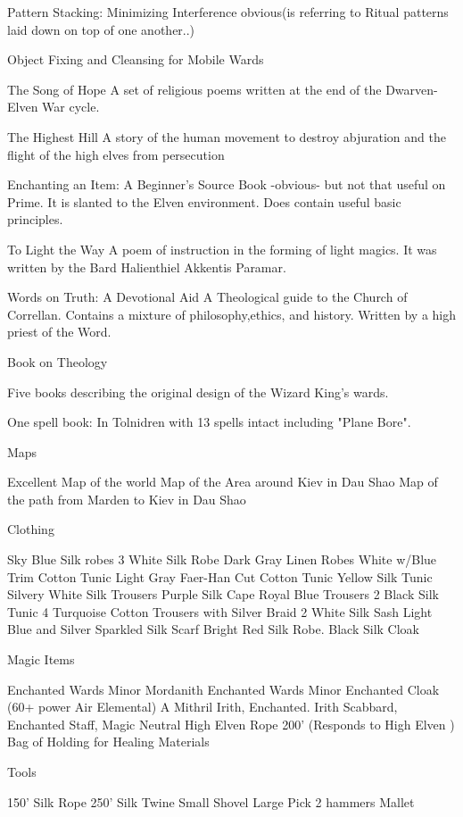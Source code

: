 Pattern Stacking: Minimizing Interference
obvious(is referring to Ritual patterns laid down on top of one
another..)

Object Fixing and Cleansing for Mobile Wards

The Song of Hope
A set of religious poems written at the end
of the Dwarven-Elven War cycle.

The Highest Hill
A story of the human movement to destroy abjuration
and the flight of the high elves from persecution

Enchanting an Item: A Beginner's Source Book
-obvious- but not that
useful on Prime. It is slanted to the  Elven environment. Does
contain useful basic principles.

To Light the Way
A poem of instruction in the forming of light magics. It was written
by the Bard Halienthiel Akkentis Paramar.

Words on Truth: A Devotional Aid
A Theological guide to the Church
of Correllan. Contains a mixture of philosophy,ethics, and history. Written
by a high priest of the Word.

Book on Theology


Five books describing the original design of the Wizard King's
wards.

One spell book: In Tolnidren with 13 spells intact including 
"Plane Bore".

Maps


Excellent Map of the world
Map of the Area around Kiev in Dau Shao
Map of the path from Marden to Kiev in Dau Shao


Clothing


Sky Blue Silk robes  3
White Silk Robe
Dark Gray Linen Robes
White w/Blue Trim Cotton Tunic
Light Gray Faer-Han Cut Cotton Tunic
Yellow Silk Tunic
Silvery White Silk Trousers
Purple Silk Cape
Royal Blue Trousers  2
Black Silk Tunic  4
Turquoise Cotton Trousers with Silver Braid  2
White Silk Sash
Light Blue and Silver Sparkled Silk Scarf
Bright Red Silk Robe.
Black Silk Cloak



Magic Items


Enchanted Wards Minor
Mordanith Enchanted Wards Minor
Enchanted Cloak (60+ power Air Elemental)
A Mithril Irith, Enchanted.
Irith Scabbard, Enchanted
Staff, Magic Neutral
High Elven Rope 200' (Responds to High Elven )
Bag of Holding for Healing Materials


Tools


150' Silk Rope
250' Silk Twine
Small Shovel
Large Pick
2 hammers
Mallet


